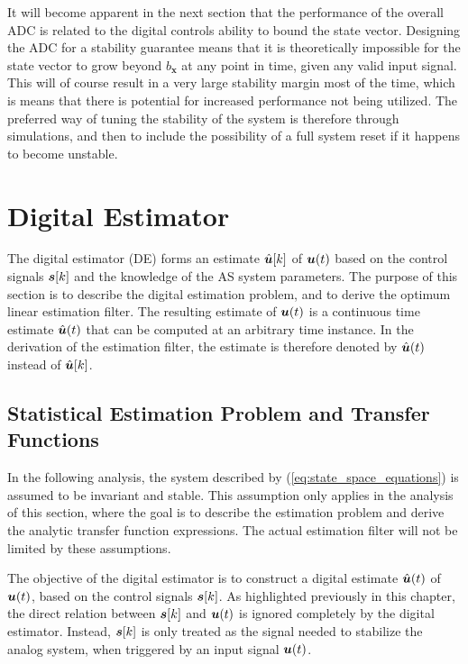 It will become apparent in the next section that the performance of the overall ADC is related to the digital controls ability to bound the state vector. Designing the ADC for a stability guarantee means that it is theoretically impossible for the state vector to grow beyond $b_{\bm{x}}$ at any point in time, given any valid input signal. This will of course result in a very large stability margin most of the time, which is means that there is potential for increased performance not being utilized. The preferred way of tuning the stability of the system is therefore through simulations, and then to include the possibility of a full system reset if it happens to become unstable.




















\section{Digital Estimator}
The digital estimator (DE) forms an estimate $\hat{\bm{u}}[k]$ of $\bm{u}(t)$ based on the control signals $\bm{s}[k]$ and the knowledge of the AS system parameters. The purpose of this section is to describe the digital estimation problem, and to derive the optimum linear estimation filter. The resulting estimate of $\bm{u}(t)$ is a continuous time estimate $\hat{\bm{u}}(t)$ that can be computed at an arbitrary time instance. In the derivation of the estimation filter, the estimate is therefore denoted by $\hat{\bm{u}}(t)$ instead of $\hat{\bm{u}}[k]$.

\subsection{Statistical Estimation Problem and Transfer Functions}
In the following analysis, the system described by (\ref{eq:state_space_equations}) is assumed to be invariant and stable. This assumption only applies in the analysis of this section, where the goal is to describe the estimation problem and derive the analytic transfer function expressions. The actual estimation filter will not be limited by these assumptions.

The objective of the digital estimator is to construct a digital estimate $\hat{\bm{u}}(t)$ of $\bm{u}(t)$, based on the control signals $\bm{s}[k]$. As highlighted previously in this chapter, the direct relation between $\bm{s}[k]$ and $\bm{u}(t)$ is ignored completely by the digital estimator. Instead, $\bm{s}[k]$ is only treated as the signal needed to stabilize the analog system, when triggered by an input signal $\bm{u}(t)$.


